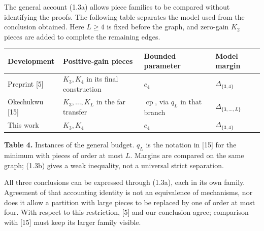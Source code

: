 \documentclass[english,11pt,a4paper]{article}
\newcounter{none}
\begin{document}
The general account (1.3a) allows piece families to be compared without identifying the proofs. The following table separates the model used from the conclusion obtained. Here \(L\ge4\) is fixed before the graph, and zero-gain \(K_2\) pieces are added to complete the remaining edges.


{\def\LTcaptype{none} %
\begin{longtable}[c]{@{}
  >{\raggedright\arraybackslash}p{}
  >{\raggedright\arraybackslash}p{}
  >{\raggedright\arraybackslash}p{}
  >{\raggedright\arraybackslash}p{}@{}}
\toprule\noalign{}
\begin{minipage}[b]{\linewidth}\raggedright
Development
\end{minipage} & \begin{minipage}[b]{\linewidth}\raggedright
Positive-gain pieces
\end{minipage} & \begin{minipage}[b]{\linewidth}\raggedright
Bounded parameter
\end{minipage} & \begin{minipage}[b]{\linewidth}\raggedright
Model margin
\end{minipage} \\
\midrule\noalign{}
\endhead
\bottomrule\noalign{}
\endlastfoot
Preprint {[}5{]} & \(K_3,K_4\) in its final construction & \(c_4\) & \(\Delta_{\{3,4\}}\) \\
Okechukwu {[}15{]} & \(K_3,\ldots,K_L\) in the far transfer & \(\operatorname{cp}\), via \(q_L\) in that branch & \(\Delta_{\{3,\ldots,L\}}\) \\
This work & \(K_3,K_4\) & \(c_4\) & \(\Delta_{\{3,4\}}\) \\
\end{longtable}
}

\textbf{Table 4.} Instances of the general budget. \(q_L\) is the notation in {[}15{]} for the minimum with pieces of order at most \(L\). Margins are compared on the same graph; (1.3b) gives a weak inequality, not a universal strict separation.

All three conclusions can be expressed through (1.3a), each in its own family. Agreement of that accounting identity is not an equivalence of mechanisms, nor does it allow a partition with large pieces to be replaced by one of order at most four. With respect to this restriction, {[}5{]} and our conclusion agree; comparison with {[}15{]} must keep its larger family visible.
\end{document}
